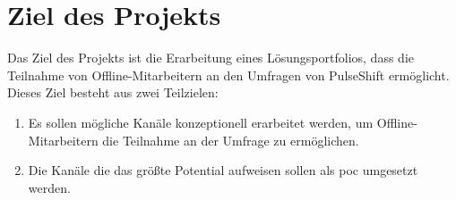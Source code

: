 \section{Ziel des Projekts}
\label{sec:introduction:goals}
Das Ziel des Projekts ist die Erarbeitung eines Lösungsportfolios, dass die Teilnahme von Offline-Mitarbeitern an den Umfragen von PulseShift ermöglicht. Dieses Ziel besteht aus zwei Teilzielen:

\begin{enumerate}
\item Es sollen mögliche Kanäle konzeptionell erarbeitet werden, um Offline-Mitarbeitern die Teilnahme an der Umfrage zu ermöglichen.
\item Die Kanäle die das größte Potential aufweisen sollen als \gls{poc} umgesetzt werden.
\end{enumerate}

